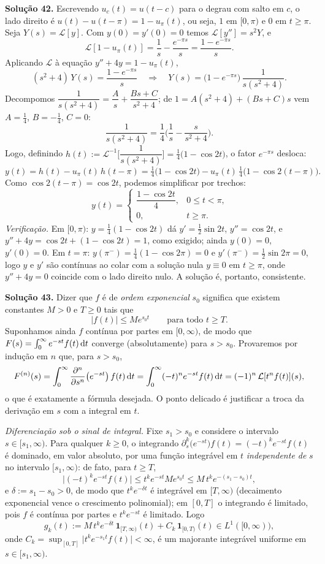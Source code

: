 \bigskip\noindent\textbf{Solução 42.}\quad
Escrevendo $u_c(t)=u(t-c)$ para o degrau com salto em $c$, o lado direito é $u(t)-u(t-\pi)=1-u_\pi(t)$, ou seja, $1$ em $[0,\pi)$ e $0$ em $t\ge\pi$. Seja $Y(s)=\mathcal{L}[y]$. Com $y(0)=y'(0)=0$ temos $\mathcal{L}[y'']=s^2Y$, e
\[
\mathcal{L}[1-u_\pi(t)]=\frac1s-\frac{e^{-\pi s}}{s}=\frac{1-e^{-\pi s}}{s}.
\]
Aplicando $\mathcal{L}$ à equação $y''+4y=1-u_\pi(t)$,
\[
(s^2+4)\,Y(s)=\frac{1-e^{-\pi s}}{s}
\quad\Longrightarrow\quad
Y(s)=\big(1-e^{-\pi s}\big)\,\frac{1}{s(s^2+4)}.
\]
Decompomos $\dfrac{1}{s(s^2+4)}=\dfrac{A}{s}+\dfrac{Bs+C}{s^2+4}$; de $1=A(s^2+4)+(Bs+C)s$ vem $A=\tfrac14$, $B=-\tfrac14$, $C=0$:
\[
\frac{1}{s(s^2+4)}=\frac14\Big(\frac1s-\frac{s}{s^2+4}\Big).
\]
Logo, definindo $h(t):=\mathcal{L}^{-1}\Big[\dfrac{1}{s(s^2+4)}\Big]=\tfrac14\big(1-\cos 2t\big)$, o fator $e^{-\pi s}$ desloca:
\[
y(t)=h(t)-u_\pi(t)\,h(t-\pi)
=\tfrac14\big(1-\cos 2t\big)-u_\pi(t)\,\tfrac14\big(1-\cos 2(t-\pi)\big).
\]
Como $\cos 2(t-\pi)=\cos 2t$, podemos simplificar por trechos:
\[
\boxed{\,y(t)=\begin{cases}\dfrac{1-\cos 2t}{4}, & 0\le t<\pi,\\[2mm] 0, & t\ge\pi.\end{cases}}
\]
\emph{Verificação.} Em $[0,\pi)$: $y=\tfrac14(1-\cos2t)$ dá $y'=\tfrac12\sin2t$, $y''=\cos2t$, e $y''+4y=\cos2t+(1-\cos2t)=1$, como exigido; ainda $y(0)=0$, $y'(0)=0$. Em $t=\pi$: $y(\pi^-)=\tfrac14(1-\cos2\pi)=0$ e $y'(\pi^-)=\tfrac12\sin2\pi=0$, logo $y$ e $y'$ são contínuas ao colar com a solução nula $y\equiv0$ em $t\ge\pi$, onde $y''+4y=0$ coincide com o lado direito nulo. A solução é, portanto, consistente.


\bigskip\noindent\textbf{Solução 43.}\quad
Dizer que $f$ é de \emph{ordem exponencial} $s_0$ significa que existem constantes $M>0$ e $T\ge0$ tais que
\[
|f(t)|\le M e^{s_0 t}\qquad\text{para todo }t\ge T.
\]
Suponhamos ainda $f$ contínua por partes em $[0,\infty)$, de modo que $F(s)=\int_0^\infty e^{-st}f(t)\,\mathrm{d} t$ converge (absolutamente) para $s>s_0$. Provaremos por indução em $n$ que, para $s>s_0$,
\[
F^{(n)}(s)=\int_0^\infty \frac{\partial^n}{\partial s^n}\big(e^{-st}\big)\,f(t)\,\mathrm{d} t
=\int_0^\infty (-t)^n e^{-st}f(t)\,\mathrm{d} t=(-1)^n\,\mathcal{L}[t^n f(t)](s),
\]
o que é exatamente a fórmula desejada. O ponto delicado é justificar a troca da derivação em $s$ com a integral em $t$.

\emph{Diferenciação sob o sinal de integral.} Fixe $s_1>s_0$ e considere o intervalo $s\in[s_1,\infty)$. Para qualquer $k\ge0$, o integrando $\partial_s^k\big(e^{-st}\big)f(t)=(-t)^k e^{-st}f(t)$ é dominado, em valor absoluto, por uma função integrável em $t$ \emph{independente de} $s$ no intervalo $[s_1,\infty)$: de fato, para $t\ge T$,
\[
\big|(-t)^k e^{-st}f(t)\big|\le t^k e^{-st}M e^{s_0 t}\le M\,t^k e^{-(s_1-s_0)t},
\]
e $\delta:=s_1-s_0>0$, de modo que $t^k e^{-\delta t}$ é integrável em $[T,\infty)$ (decaimento exponencial vence o crescimento polinomial); em $[0,T]$ o integrando é limitado, pois $f$ é contínua por partes e $t^k e^{-st}$ é limitado. Logo
\[
g_k(t):=M\,t^k e^{-\delta t}\,\mathbf 1_{[T,\infty)}(t)+C_k\,\mathbf 1_{[0,T)}(t)\in L^1([0,\infty)),
\]
onde $C_k=\sup_{[0,T]}\big|t^k e^{-s_1 t}f(t)\big|<\infty$, é um majorante integrável uniforme em $s\in[s_1,\infty)$.

